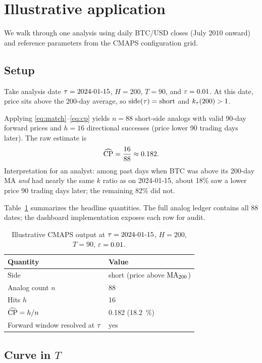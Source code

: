 \section{Illustrative application}
\label{sec:illustration}

We walk through one analysis using daily BTC/USD closes (July 2010 onward) and reference parameters from the CMAPS configuration grid.

\subsection{Setup}

Take analysis date $\tau = \text{2024-01-15}$, $H=200$, $T=90$, and $\varepsilon=0.01$.
At this date, price sits above the 200-day average, so $\text{side}(\tau)=\text{short}$ and $k_{\tau}(200) > 1$.

Applying \eqref{eq:match}--\eqref{eq:cp} yields $n=88$ short-side analogs with valid 90-day forward prices and $h=16$ directional successes (price lower 90 trading days later).
The raw estimate is
\[
  \widehat{\mathrm{CP}} = \frac{16}{88} \approx 0.182.
\]
Interpretation for an analyst: among past days when BTC was above its 200-day MA \emph{and} had nearly the same $k$ ratio as on 2024-01-15, about 18\% saw a lower price 90 trading days later; the remaining 82\% did not.

Table~\ref{tab:example} summarizes the headline quantities.
The full analog ledger contains all 88 dates; the dashboard implementation exposes each row for audit.

\begin{table}[ht]
  \centering
  \caption{Illustrative CMAPS output at $\tau = \text{2024-01-15}$, $H=200$, $T=90$, $\varepsilon=0.01$.}
  \label{tab:example}
  \begin{tabular}{@{}ll@{}}
    \toprule
    Quantity & Value \\
    \midrule
    Side & short (price above $\mathrm{MA}_{200}$) \\
    Analog count $n$ & 88 \\
    Hits $h$ & 16 \\
    $\widehat{\mathrm{CP}} = h/n$ & 0.182 (\SI{18.2}{\percent}) \\
  Forward window resolved at $\tau$ & yes \\
    \bottomrule
  \end{tabular}
\end{table}

\subsection{Curve in \texorpdfstring{$T$}{T}}

